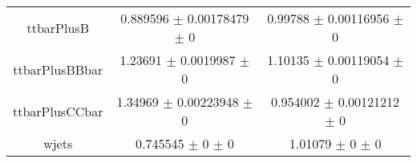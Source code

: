 \begin{table}
\begin{tabular}{ccc}
ttbarPlusB & \num{0.889596} $\pm$ \num{0.00178479} $\pm$ \num{0} & \num{0.99788} $\pm$ \num{0.00116956} $\pm$ \num{0}\\
ttbarPlusBBbar & \num{1.23691} $\pm$ \num{0.0019987} $\pm$ \num{0} & \num{1.10135} $\pm$ \num{0.00119054} $\pm$ \num{0}\\
ttbarPlusCCbar & \num{1.34969} $\pm$ \num{0.00223948} $\pm$ \num{0} & \num{0.954002} $\pm$ \num{0.00121212} $\pm$ \num{0}\\
wjets & \num{0.745545} $\pm$ \num{0} $\pm$ \num{0} & \num{1.01079} $\pm$ \num{0} $\pm$ \num{0}\\
\bottomrule
\end{tabular}
\end{table}